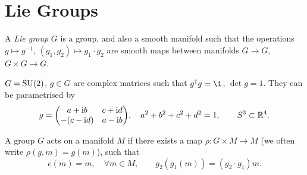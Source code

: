 \documentclass[a4paper,11pt]{article}
\begin{document}
    \section{Lie Groups}
    \begin{defi}
        A \emph{Lie group} $G$ is a group, and also a smooth manifold such that the operations $g \mapsto g^{-1}$, $(g_1, g_2) \mapsto g_1 \cdot g_2$ are smooth maps between manifolds $G \to G$, $G \times G \to G$.
    \end{defi}
    \begin{ex}
        $G = \operatorname{SU}(2)$, $g \in G$ are complex matrices such that $g^{\dagger} g = \1$, $\det g = 1$. They can be parametrised by 
        \begin{equation}
            g = \mqty(a + \mathrm{i} b & c + \mathrm{i} d\\-(c - \mathrm{i} d) & a - \mathrm{i} b), \quad a^2 + b^2 + c^2 + d^2 = 1, \qquad S^3 \subset \mathbb{R}^4.
        \end{equation}
    \end{ex}

    \begin{defi}
        A group $G$ acts on a manifold $M$ if there exists a map $\rho: G \times M \to M$ (we often write $\rho(g,m) = g(m)$), such that 
        \begin{equation}
            e(m) = m, \quad \forall m \in M, \qquad g_2(g_1(m)) = (g_2 \cdot g_1) m.
        \end{equation} 
    \end{defi}
\end{document}
